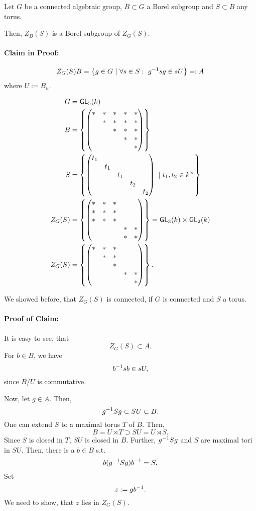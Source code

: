 \begin{lemma}
	Let $G$ be a connected algebraic group, $B \subset G$ a Borel subgroup and $S \subset B$ any torus.
	
	Then, $Z_B(S)$ is a Borel subgroup of $Z_G(S)$.
\end{lemma}
\paragraph{Claim in Proof:}
\[ Z_G(S) B = \left\lbrace g \in G ~ | ~ \forall s \in S:~g^{-1} s g \in sU\right\rbrace =:A \]
where $U := B_u$.
\begin{example}
	\begin{align*}
	G &= \textsf{GL}_5(k)\\
	B &= \left\lbrace\left(\begin{matrix}  * & * & * & * & *\\  & * & * & * & *\\  &  & * & * & *\\  &  &  & * & *\\  &  &  &  & *  \end{matrix}\right)\right\rbrace\\
	S &= \left\lbrace\left(\begin{matrix} t_1 & & & & \\ & t_1 & & & \\ & & t_1 & & \\ & & & t_2 & \\ & & & & t_2 \end{matrix}\right) ~ | ~ t_1, t_2 \in k^\times\right\rbrace\\
	Z_G(S) &= \left\lbrace\left(\begin{matrix}  * & * & * &  & \\ * & * & * &  & \\ * & * & * &  & \\  &  &  & * & *\\  &  &  & * & * \end{matrix}\right)\right\rbrace = \textsf{GL}_3(k) \times \textsf{GL}_2(k)\\
	Z_G(S) &= \left\lbrace\left(\begin{matrix}  * & * & * &  & \\  & * & * &  & \\  &  & * &  & \\  &  &  & * & *\\  &  &  &  & * \end{matrix}\right)\right\rbrace.
	\end{align*}
\end{example}
\newpage
We showed before, that $Z_G(S)$ is connected, if $G$ is connected and $S$ a torus.

\paragraph{Proof of Claim:} It is easy to see, that
\[ Z_G(S) \subset A. \]
For $b \in B$, we have
\[ b^{-1} sb\in sU, \]
since $B/U$ is commutative.

Now, let $g \in A$. Then,
\[ g^{-1} S g \subset SU \subset B. \]
One can extend $S$ to a maximal torus $T$ of $B$. Then,
\[ B = U \rtimes T \supset SU = U \rtimes S.\]
Since $S$ is closed in $T$, $SU$ is closed in $B$. Further, $g^{-1} S g$ and $S$ are maximal tori in $SU$. Then, there is a $b \in B$ s.t.
\[ b(g^{-1} S g)b^{-1} = S. \]
Set
\[ z:= gb^{-1}. \]
We need to show, that $z$ lies in $Z_G(S)$.

